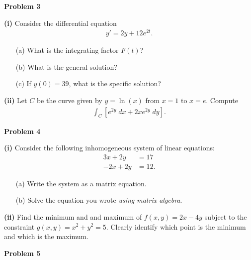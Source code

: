 \documentclass[12pt]{amsbook}
\begin{document}
\newpage

\textbf{Problem 3}

\vspace{.25cm}

\textbf{(i)} Consider the differential equation
\begin{align*}
y' = 2y+12e^{2t}.
\end{align*}
\begin{itemize}
\item[(a)] What is the integrating factor $F(t)$?
\item[(b)] What is the general solution?
\item[(c)] If $y(0) = 39$, what is the specific solution?
\end{itemize}


\vspace{10cm}

\textbf{(ii)} Let $C$ be the curve given by  $y=\ln(x)$ from $x=1$ to $x=e$. Compute
\begin{align*}
\int_C \left[e^{2y} \; dx + 2xe^{2y} \; dy\right].
\end{align*}




\newpage

\textbf{Problem 4}

\vspace{.25cm}

\textbf{(i)} Consider the following inhomogeneous system of linear equations:
\begin{align*}
3x+2y &= 17 \\
-2x+2y &= 12.
\end{align*}
\begin{itemize}
\item[(a)] Write the system as a matrix equation.
\item[(b)] Solve the equation you wrote \emph{using matrix algebra}.
\end{itemize}

\vspace{9cm}

\textbf{(ii)} Find the minimum and and maximum of $f(x,y) = 2x-4y$ subject to the constraint $g(x,y) = x^2+y^2 = 5$. Clearly identify which point is the minimum and which is the maximum.









\newpage

\textbf{Problem 5}
\end{document}

